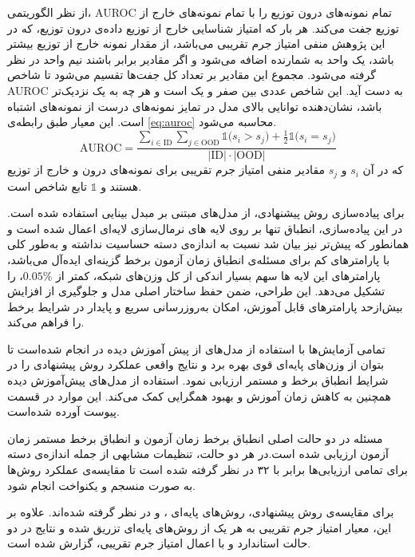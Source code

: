 \begin{itemize}
	از نظر الگوریتمی، AUROC تمام نمونه‌های درون توزیع را با تمام نمونه‌های خارج از توزیع جفت می‌کند. هر بار که امتیاز شناسایی خارج از توزیع داده‌ی درون توزیع، که در این پژوهش منفی امتیاز جرم تقریبی می‌باشد، از مقدار نمونه خارج از توزیع بیشتر باشد، یک واحد به شمارنده اضافه می‌شود و اگر مقادیر برابر باشند نیم واحد در نظر گرفته می‌شود. مجموع این مقادیر بر تعداد کل جفت‌ها تقسیم می‌شود تا شاخص AUROC به دست آید. این شاخص عددی بین صفر و یک است و هر چه به یک نزدیک‌تر باشد، نشان‌دهنده توانایی بالای مدل در تمایز نمونه‌های درست از نمونه‌های اشتباه است. این معیار طبق رابطه‌ی \ref{eq:auroc} محاسبه می‌شود.
	\begin{equation}
		\label{eq:auroc}
		\text{AUROC} = \frac{\sum_{i \in \text{ID}} \sum_{j \in \text{OOD}} \mathbb{1}\big( s_i > s_j \big) + \frac{1}{2}\mathbb{1}\big( s_i = s_j \big)}{|\text{ID}| \cdot |\text{OOD}|}
	\end{equation}
	که در آن $s_i$ و $s_j$ مقادیر منفی امتیاز جرم تقریبی برای نمونه‌های درون و خارج از توزیع هستند و $\mathbb{1}$ تابع شاخص است.
\end{itemize}


برای پیاده‌سازی روش پیشنهادی، از مدل‌های مبتنی بر مبدل بینایی استفاده شده است. در این پیاده‌سازی، انطباق تنها بر روی لایه های نرمال‌سازی لایه‌ای اعمال شده است و همانطور که پیش‌تر نیز بیان شد نسبت به اندازه‌ی دسته حساسیت نداشته و به‌طور کلی با پارامتر‌های کم برای مسئله‌ی انطباق زمان آزمون برخط گزینه‌ای ایده‌آل می‌باشد، پارامتر‌های این لایه ها سهم بسیار اندکی از کل وزن‌های شبکه، کمتر از $0.05\%$، را تشکیل می‌دهد. این طراحی، ضمن حفظ ساختار اصلی مدل و جلوگیری از افزایش بیش‌ازحد پارامترهای قابل آموزش، امکان به‌روزرسانی سریع و پایدار در شرایط برخط را فراهم می‌کند.  

تمامی آزمایش‌ها با استفاده از مدل‌های از پیش آموزش دیده در  انجام شده‌است تا بتوان از وزن‌های پایه‌ای قوی بهره برد و نتایج واقعی عملکرد روش پیشنهادی را در شرایط انطباق برخط و مستمر ارزیابی نمود. استفاده از مدل‌های پیش‌آموزش دیده همچنین به کاهش زمان آموزش و بهبود همگرایی کمک می‌کند. این موارد در قسمت پیوست آورده شده‌است.

مسئله در دو حالت اصلی انطباق برخط زمان آزمون و انطباق برخط مستمر زمان آزمون ارزیابی شده است.در هر دو حالت، تنظیمات مشابهی از جمله اندازه‌ی دسته برای تمامی ارزیابی‌ها برابر با ۳۲ در نظر گرفته شده است تا مقایسه‌ی عملکرد روش‌ها به صورت منسجم و یکنواخت انجام شود.  

برای مقایسه‌ی روش پیشنهادی، روش‌های پایه‌ای ،  و  در نظر گرفته شده‌اند. علاوه بر این، معیار امتیاز جرم تقریبی به هر یک از روش‌های پایه‌ای تزریق شده و نتایج در دو حالت استاندارد و با اعمال امتیاز جرم تقریبی، گزارش شده است.  


